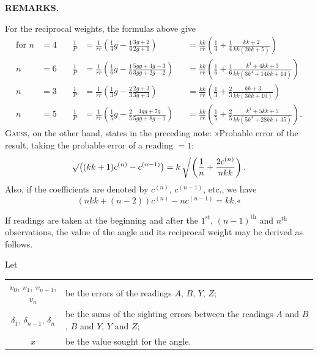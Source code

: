 \par\clearpage
\noindent{}\hfill{\small\textbf{REMARKS.}}\hfill\null\par\medskip

For the reciprocal weights, the formulas above give
\[
\begin{alignedat}{3}
 \text{for }n&=4\quad&
 \frac{1}{P}&=\frac{1}{rr}\left(\tfrac14g-\tfrac14\frac{3g+2}{2g+1}\right)&
 &=\frac{kk}{rr}\left(\tfrac14+\tfrac14\frac{kk+2}{kk(2kk+5)}\right)\\
 n&=6&
 \frac{1}{P}&=\frac{1}{rr}\left(\tfrac16g-\tfrac16\frac{5gg+4g-3}{3gg+2g-2}\right)&
 &=\frac{kk}{rr}\left(\tfrac16+\tfrac16\frac{k^4+4kk+3}{kk(3k^4+14kk+14)}\right)\\
 n&=3&
 \frac{1}{P}&=\frac{1}{rr}\left(\tfrac13g-\tfrac23\frac{2g+3}{3g+4}\right)&
 &=\frac{kk}{rr}\left(\tfrac13+\tfrac23\frac{kk+3}{kk(3kk+10)}\right)\\
 n&=5&
 \frac{1}{P}&=\frac{1}{rr}\left(\tfrac15g-\tfrac25\frac{4gg+7g}{5gg+8g-1}\right)&
 &=\frac{kk}{rr}\left(\tfrac15+\tfrac25\frac{k^4+5kk+5}{kk(5k^4+28kk+35)}\right).
\end{alignedat}
\]
\textsc{Gauss}, on the other hand, states in the preceding note: »Probable error of the result, taking the probable error of a reading $=1$:
\[
 \surd\bigl((kk+1)c^{(n)}-c^{(n-1)}\bigr)
 =k\left\delimiter"270370\relax\vphantom{\frac{1}{n}}\right.\!
 \left(\frac{1}{n}+\frac{2c^{(n)}}{nkk}\right).
\]
\indent Also, if the coefficients are denoted by $c^{(n)}$, $c^{(n-1)}$, etc., we have
\[
 (nkk+(n-2))c^{(n)}-nc^{(n-1)}=kk.\text{«}
\]

If readings are taken at the beginning and after the $1^{\text{st}}$, $(n-1)^{\text{th}}$ and $n^{\text{th}}$ observations, the value of the angle and its reciprocal weight may be derived as follows.

Let\par
\noindent
\begin{tabular}{@{}c@{\quad}p{.80\linewidth}@{}}
 $v_0$, $v_1$, $v_{n-1}$, $v_n$ & be the errors of the readings $A$, $B$, $Y$, $Z$;\\
 $\delta_1$, $\delta_{n-1}$, $\delta_n$ & be the sums of the sighting errors between the readings $A$ and $B$, $B$ and $Y$, $Y$ and $Z$;\\
 $x$ & be the value sought for the angle.
\end{tabular}\par

